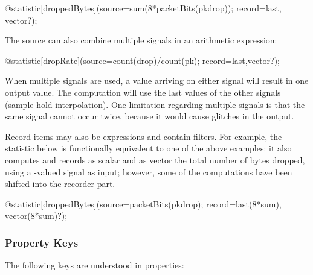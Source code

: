 \begin{ned}
\begin{ned}
@statistic[droppedBytes](source=sum(8*packetBits(pkdrop)); record=last,
vector?);
\end{ned}

The source can also combine multiple signals in an arithmetic expression:

\begin{ned}
@statistic[dropRate](source=count(drop)/count(pk); record=last,vector?);
\end{ned}

When multiple signals are used, a value arriving on either signal will
result in one output value. The computation will use the last values of the
other signals (sample-hold interpolation). One limitation regarding
multiple signals is that the same signal cannot occur twice, because it
would cause glitches in the output.

Record items may also be expressions and contain filters. For example, the
statistic below is functionally equivalent to one of the above examples: it
also computes and records as scalar and as vector the total number of bytes
dropped, using a -valued signal as input; however, some of
the computations have been shifted into the recorder part.

\begin{ned}
@statistic[droppedBytes](source=packetBits(pkdrop); record=last(8*sum),
vector(8*sum)?);
\end{ned}


\subsubsection{Property Keys}
\label{sec:simple-modules:declared-statistics:property-keys}

The following keys are understood in  properties:


\end{ned}
